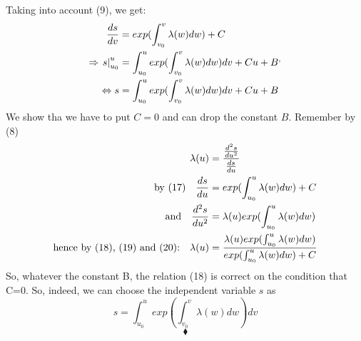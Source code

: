 Taking into account (9), we get:
\begin{align}
\dv{s}{v}  &= exp(\int^v_{v_0} \lambda (w)dw) + C\\
\Rightarrow \left. s \right|^u_{u_0} &=\int^u_{u_0}  exp(\int^v_{v_0} \lambda (w)dw)dv +Cu + B^,\\
\Leftrightarrow  s  &=\int^u_{u_0}  exp(\int^v_{v_0} \lambda (w)dw)dv +Cu + B
\end{align}
We show tha we have to put $C=0$ and can drop the constant $B$. Remember by (8)
\begin{align}
\lambda (u) &= \frac{\dv[2]{s}{u}}{\dv{s}{u}}\\
\text{by (17)} \quad \dv{s}{u}  &=exp(\int^u_{u_0} \lambda (w)dw) +C\\
\text{and}\quad \dv[2]{s}{u}  &= \lambda (u) exp(\int^u_{u_0} \lambda (w)dw) \\
\text{hence by (18), (19) and (20):} \quad \lambda (u)&= \frac{\lambda (u) exp(\int^u_{u_0} \lambda (w)dw)}{exp(\int^u_{u_0} \lambda (w)dw) +C}
\end{align}
So, whatever the constant B, the relation (18) is correct on the condition that C=0. 
So, indeed, we can choose the independent variable $s$ as
$$s  =\int^u_{u_0}  exp(\int^v_{v_0} \lambda (w)dw)dv $$ 
$$\blacklozenge$$
\newpage

